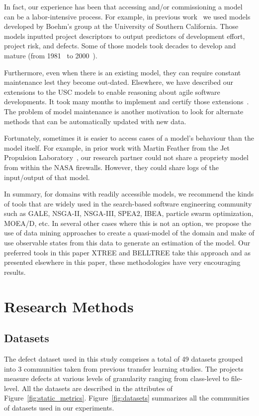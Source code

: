 \documentclass[10pt,journal,compsoc]{IEEEtran}
\newcommand{\fig}[1]{Figure~\ref{fig:#1}}
\begin{document}
In fact, our experience has been that accessing and/or commissioning a model can be a labor-intensive process.
For  example, in previous work~\cite{me07f} we used models developed by Boehm's group at the University of Southern California.
Those models inputted project descriptors to output predictors of development effort, project risk, and defects.
Some of those models took decades to develop and mature (from 1981~\cite{boehm81} to 2000~\cite{boehm00b}). 

Furthermore, even when there is an existing model, they can require constant  maintenance lest they become out-dated. Elsewhere, we have described our extensions to the USC models to enable reasoning about agile software developments. It took many months to implement and certify those extensions~\cite{me09i,me09j}. The problem of model maintenance is another motivation to look for alternate methods that can be automatically updated with new data.

Fortunately, sometimes  it is easier to access cases of a model's behaviour than the model itself. For example, in prior work with Martin  Feather from the Jet Propulsion Laboratory~\cite{fea02a},  our research partner could not share a propriety model from within the NASA firewalls. However, they could share logs of the input/output of that model.

In summary, for domains with readily accessible models, we recommend
the kinds of tools that are widely used in the search-based
software engineering community such as GALE, NSGA-II, NSGA-III, SPEA2, IBEA, particle swarm optimization, MOEA/D, etc. In several other cases where this is not an option, we propose the use of data mining approaches to create a quasi-model of the domain 
and make of use observable states from this data to generate an estimation of the model. Our preferred tools in this paper XTREE and BELLTREE take this approach and as presented elsewhere in this paper, these methodologies have very encouraging results.


\section{Research Methods}
\label{sect:prelim}
\subsection{Datasets}
\label{sect:data}
The defect dataset used in this study comprises a total of 49 datasets grouped into 3 communities taken
from previous transfer learning studies. The projects measure defects at various levels of granularity ranging from class-level to file-level. All the datasets are described in the attributes of \fig{static_metrics}.
\fig{datasets} summarizes all the communities of datasets used in our experiments. 
\end{document}

